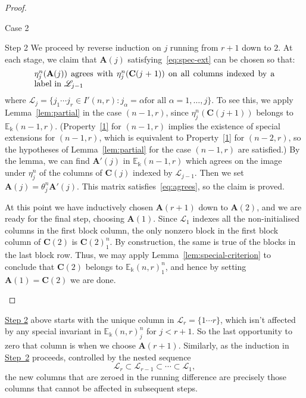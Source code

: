 \documentclass[ALCO,ThmDefs,Unicode,epreuves]{cedram}
\newcommand{\E}{\mathbb{E}}
\newcommand{\Lin}{{\mathscr{L}}}
\newcommand{\bA}{\mathbf{A}}
\newcommand{\bC}{\mathbf{C}}
\begin{document}
\begin{proof}
\begin{enonce*}{\hypertarget{Case 2}{Case 2}}
\begin{enonce*}[remark]{\hypertarget{Step 2}{Step 2}} We proceed by reverse induction on $j$ running from
$r+1$ down to $2$. At each stage, we claim that $\bA(j)$ satisfying~\eqref{eq:spec-ext} can be chosen so that:
\begin{equation}\label{eq:agrees}
 \begin{minipage}{4in}
 $\eta^n_j(\bA(j))$ agrees with $\eta^n_j(\bC(j+1))$ on all columns
 indexed by a label in $\Lin_{j-1}$
 \end{minipage}
\end{equation}
where $\Lin_j = \{j_1\cdots j_r \in I'(n,r): j_\alpha=\alpha \text{
 for all } \alpha=1, \dots, j\}$. To see this, we apply Lemma~\ref{lem:partial} in the case $(n-1,r)$, since $\eta^n_j(\bC(j+1))$
belongs to $\E_\Bbbk(n-1,r)$. (Property~\ref{1} for $(n-1,r)$ implies
the existence of special extensions for $(n-1,r)$, which is equivalent
to Property~\ref{1} for $(n-2,r)$, so the hypotheses of Lemma~\ref{lem:partial} for the case $(n-1,r)$ are satisfied.) By the lemma, we can find $\bA'(j)$ in $\E_\Bbbk(n-1,r)$ which agrees on the image
under $\eta^n_j$ of the columns of $\bC(j)$ indexed by
$\Lin_{j-1}$. Then we set $\bA(j) = \theta^n_j \bA'(j)$. This matrix
satisfies~\eqref{eq:agrees}, so the claim is proved.

At this point we have inductively chosen $\bA(r+1)$ down to $\bA(2)$,
and we are ready for the final step, choosing $\bA(1)$. Since
$\Lin_1$ indexes all the non-initialised columns in the first block
column, the only nonzero block in the first block column of $\bC(2)$
is $\bC(2)^n_1$. By construction, the same is true of the blocks in
the last block row. Thus, we may apply Lemma~\ref{lem:special-criterion} to conclude that $\bC(2)$ belongs to $\E_\Bbbk(n,r)^n_1$, and hence by setting $\bA(1) = \bC(2)$ we are
done.\qedhere
\end{enonce*}
\end{enonce*}
\end{proof}


\hyperlink{Step 2}{Step 2} above starts with the unique column in $\Lin_r = \{1 \cdots
r\}$, which isn't affected by any special invariant in
$\E_\Bbbk(n,r)^n_j$ for $j<r+1$. So the last opportunity to zero that
column is when we choose $\bA(r+1)$. Similarly, as the induction in
\hyperlink{Step 2}{Step~2} proceeds, controlled by the nested sequence
\[
\Lin_{r} \subset \Lin_{r-1} \subset \cdots \subset \Lin_1,
\]
the new columns that are zeroed in the running difference are
precisely those columns that cannot be affected in subsequent steps. 
\end{document}

